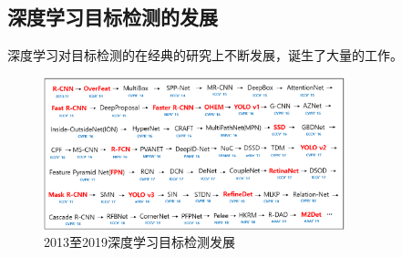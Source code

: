 \documentclass[journal,transmag]{IEEEtran}
\begin{document}
\subsection{深度学习目标检测的发展}
深度学习对目标检测的在经典的研究上不断发展，诞生了大量的工作。
\begin{figure}[h]
\centering
\includegraphics[width=3.44in]{list.png}
\caption{2013至2019深度学习目标检测发展}
\end{figure}
\end{document}
